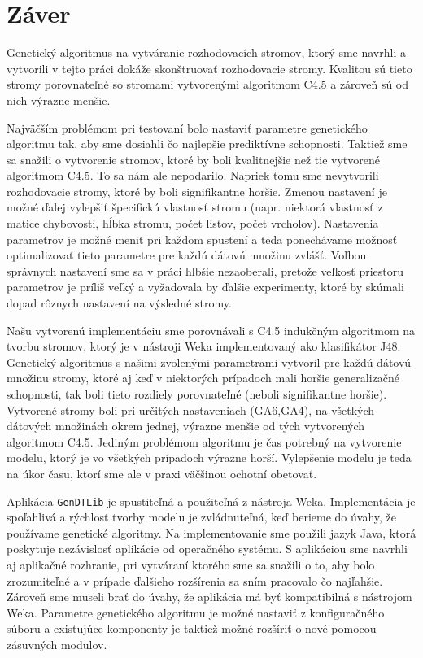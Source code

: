\chapter*{Záver}\label{kap:fin}
Genetický algoritmus na vytváranie rozhodovacích stromov, ktorý sme navrhli a vytvorili v tejto práci dokáže skonštruovať rozhodovacie stromy. Kvalitou sú tieto stromy porovnateľné so stromami vytvorenými algoritmom C4.5 a zároveň sú od nich výrazne menšie.

Najväčším problémom pri testovaní bolo nastaviť parametre genetického algoritmu tak, aby sme dosiahli čo najlepšie prediktívne schopnosti. Taktiež sme sa snažili o vytvorenie stromov, ktoré by boli kvalitnejšie než tie vytvorené algoritmom C4.5. To sa nám ale nepodarilo. Napriek tomu sme nevytvorili rozhodovacie stromy, ktoré by boli signifikantne horšie. Zmenou nastavení je možné ďalej vylepšiť špecifickú vlastnosť stromu (napr. niektorá vlastnosť z matice chybovosti, hĺbka stromu, počet listov, počet vrcholov). Nastavenia parametrov je možné meniť pri každom spustení a teda ponechávame možnosť optimalizovať tieto parametre pre každú dátovú množinu zvlášť. Voľbou správnych nastavení sme sa v práci hlbšie nezaoberali, pretože veľkosť priestoru parametrov je príliš veľký a vyžadovala by ďalšie experimenty, ktoré by skúmali dopad rôznych nastavení na výsledné stromy.

Našu vytvorenú implementáciu sme porovnávali s C4.5  indukčným algoritmom na tvorbu stromov, ktorý je v nástroji Weka implementovaný ako klasifikátor J48. Genetický algoritmus s našimi zvolenými parametrami vytvoril pre každú dátovú množinu stromy, ktoré aj keď v niektorých prípadoch mali horšie generalizačné schopnosti, tak boli tieto rozdiely porovnateľné (neboli signifikantne horšie). Vytvorené stromy boli pri určitých nastaveniach (GA6,GA4), na všetkých dátových množinách okrem jednej, výrazne menšie od tých vytvorených algoritmom C4.5. Jediným problémom algoritmu je čas potrebný na vytvorenie modelu, ktorý je vo všetkých prípadoch výrazne horší. Vylepšenie modelu je teda na úkor času, ktorí sme ale v praxi väčšinou ochotní obetovať.

Aplikácia \verb|GenDTLib| je spustiteľná a použiteľná z nástroja Weka. Implementácia je spoľahlivá a rýchlosť tvorby modelu je zvládnuteľná, keď berieme do úvahy, že používame genetické algoritmy. Na implementovanie sme použili jazyk Java, ktorá poskytuje nezávislosť aplikácie od operačného systému. S aplikáciou sme navrhli aj aplikačné rozhranie, pri vytváraní ktorého sme sa snažili o to, aby bolo zrozumiteľné a v prípade ďalšieho rozšírenia sa sním pracovalo čo najľahšie. Zároveň sme museli brať do úvahy, že aplikácia má byť kompatibilná s nástrojom Weka. Parametre genetického algoritmu je možné nastaviť z konfiguračného súboru a existujúce komponenty je taktiež možné rozšíriť o nové pomocou zásuvných modulov.

